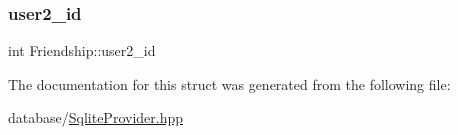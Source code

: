 \mbox{\label{structFriendship_a673079868906404d4c283b682934e501}} 
\subsubsection{\texorpdfstring{user2\+\_\+id}{user2\_id}}
{\footnotesize\ttfamily int Friendship\+::user2\+\_\+id}



The documentation for this struct was generated from the following file\+:\begin{DoxyCompactItemize}
\item 
database/\mbox{\hyperlink{SqliteProvider_8hpp}{Sqlite\+Provider.\+hpp}}\end{DoxyCompactItemize}
